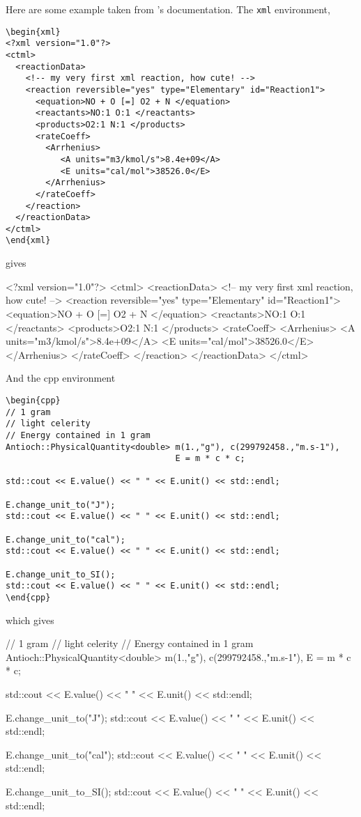 \documentclass{documentation}
\begin{document}
Here are some example taken from \Antioch's documentation.
The \texttt{xml} environment,
\begin{verbatim}
\begin{xml}
<?xml version="1.0"?>
<ctml>
  <reactionData>
    <!-- my very first xml reaction, how cute! -->
    <reaction reversible="yes" type="Elementary" id="Reaction1">
      <equation>NO + O [=] O2 + N </equation>
      <reactants>NO:1 O:1 </reactants>
      <products>O2:1 N:1 </products>
      <rateCoeff>
        <Arrhenius>
           <A units="m3/kmol/s">8.4e+09</A>
           <E units="cal/mol">38526.0</E>
        </Arrhenius>
      </rateCoeff>
    </reaction>
  </reactionData>
</ctml>
\end{xml}
\end{verbatim}
gives
\begin{xml}
<?xml version="1.0"?>
<ctml>
  <reactionData>
    <!-- my very first xml reaction, how cute! -->
    <reaction reversible="yes" type="Elementary" id="Reaction1">
      <equation>NO + O [=] O2 + N </equation>
      <reactants>NO:1 O:1 </reactants>
      <products>O2:1 N:1 </products>
      <rateCoeff>
        <Arrhenius>
           <A units="m3/kmol/s">8.4e+09</A>
           <E units="cal/mol">38526.0</E>
        </Arrhenius>
      </rateCoeff>
    </reaction>
  </reactionData>
</ctml>
\end{xml}

And the \textsf{cpp} environment
\begin{verbatim}
\begin{cpp} 
// 1 gram 
// light celerity
// Energy contained in 1 gram
Antioch::PhysicalQuantity<double> m(1.,"g"), c(299792458.,"m.s-1"), 
                                  E = m * c * c; 

std::cout << E.value() << " " << E.unit() << std::endl;

E.change_unit_to("J");
std::cout << E.value() << " " << E.unit() << std::endl;

E.change_unit_to("cal");
std::cout << E.value() << " " << E.unit() << std::endl;

E.change_unit_to_SI();
std::cout << E.value() << " " << E.unit() << std::endl;
\end{cpp}
\end{verbatim}
which gives
\begin{cpp} 
// 1 gram 
// light celerity
// Energy contained in 1 gram
Antioch::PhysicalQuantity<double> m(1.,"g"), c(299792458.,"m.s-1"), 
                                  E = m * c * c; 

std::cout << E.value() << " " << E.unit() << std::endl;

E.change_unit_to("J");
std::cout << E.value() << " " << E.unit() << std::endl;

E.change_unit_to("cal");
std::cout << E.value() << " " << E.unit() << std::endl;

E.change_unit_to_SI();
std::cout << E.value() << " " << E.unit() << std::endl;
\end{cpp}
\end{document}
